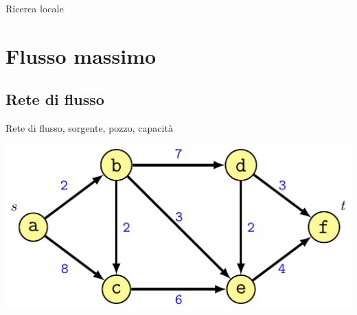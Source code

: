 \begin{frame}{Ricerca locale}

\vspace{-9pt}
\begin{center}
\end{center}

\end{frame}


\section{Flusso massimo}

\subsection{Rete di flusso}

\begin{frame}{Rete di flusso, sorgente, pozzo, capacità}

\includegraphics[width=1.0\textwidth]{template.pdf}

\end{frame}


